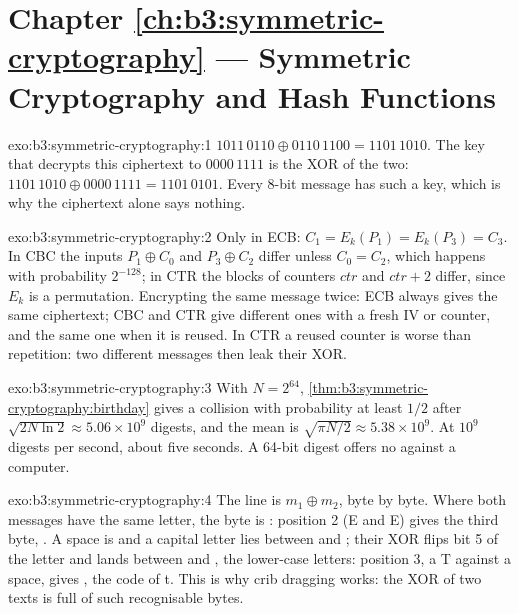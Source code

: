 \section*{Chapter \ref{ch:b3:symmetric-cryptography} --- Symmetric Cryptography and Hash Functions}

\begin{solution}{exo:b3:symmetric-cryptography:1}
$1011\,0110 \oplus 0110\,1100 = 1101\,1010$. The key that decrypts this ciphertext to $0000\,1111$ is the XOR of the two: $1101\,1010 \oplus 0000\,1111 = 1101\,0101$. Every 8-bit message has such a key, which is why the ciphertext alone says nothing.
\end{solution}

\begin{solution}{exo:b3:symmetric-cryptography:2}
Only in ECB: $C_1 = E_k(P_1) = E_k(P_3) = C_3$. In CBC the inputs $P_1 \oplus C_0$ and $P_3 \oplus C_2$ differ unless $C_0 = C_2$, which happens with probability $2^{-128}$; in CTR the  blocks of counters $\mathit{ctr}$ and $\mathit{ctr} + 2$ differ, since $E_k$ is a permutation. Encrypting the same message twice: ECB always gives the same ciphertext; CBC and CTR give different ones with a fresh IV or counter, and the same one when it is reused. In CTR a reused counter is worse than repetition: two different messages then leak their XOR.
\end{solution}

\begin{solution}{exo:b3:symmetric-cryptography:3}
With $N = 2^{64}$, \cref{thm:b3:symmetric-cryptography:birthday} gives a collision with probability at least $1/2$ after $\sqrt{2N \ln 2} \approx 5.06 \times 10^9$ digests, and the mean is $\sqrt{\pi N / 2} \approx 5.38 \times 10^9$. At $10^9$ digests per second, about five seconds. A 64-bit digest offers no  against a computer.
\end{solution}

\begin{solution}{exo:b3:symmetric-cryptography:4}
The line is $m_1 \oplus m_2$, byte by byte. Where both messages have the same letter, the byte is : position 2 (E and E) gives the third byte, . A space is  and a capital letter lies between  and ; their XOR flips bit 5 of the letter and lands between  and , the lower-case letters: position 3, a T against a space, gives , the code of t. This is why crib dragging works: the XOR of two texts is full of such recognisable bytes.
\end{solution}

